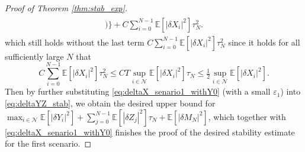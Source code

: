 \documentclass[11pt]{article}
\numberwithin{equation}{section}
\theoremstyle{definition}
\theoremstyle{remark}
\def\eps{\varepsilon}
\def\cN{\mathcal{N}}
\def\sE{{\mathbb{E}}}
\begin{document}
\begin{proof}[Proof of Theorem \ref{thm:stab_exp}]
\begin{align}
\begin{split}
\bigg)
\bigg\}
+C\sum_{i=0}^{N-1}
 \sE[|  \delta X_i|^2]\tau^2_N.
\end{split}
\end{align}
which  still holds 
without the last  term 
$C\sum_{i=0}^{N-1}
 \sE[|  \delta X_i|^2]\tau^2_N$
 since it holds for all sufficiently large $N$
 that 
$$
C\sum_{i=0}^{N-1} \sE[|  \delta X_i|^2]\tau^2_N\le CT\sup_{i\in \cN}\sE[|  \delta X_i|^2]\tau_N
 \le \tfrac{1}{2}\sup_{i\in \cN}\sE[|  \delta X_i|^2].$$
Then by further  substituting  \eqref{eq:deltaX_senario1_withY0} (with a small $\eps_1$) into \eqref{eq:deltaYZ_stab},
we obtain the desired upper bound for 
$\max_{i\in \cN}\sE[|\delta Y_i|^2]+\sum_{j=0}^{N-1}\sE[| \delta {Z}_j|^2]\tau_N+\sE[|\delta {M}_N|^2]$,
which together with \eqref{eq:deltaX_senario1_withY0} finishes the proof of the desired stability estimate for the  first scenario.



\end{proof}
\end{document}
